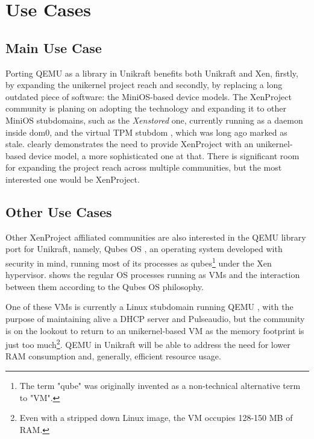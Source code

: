 \chapter{Use Cases}
\label{chapter:use-cases}

\section{Main Use Case}
\label{sec:main-use-case}

Porting QEMU as a library in Unikraft benefits both Unikraft and Xen, firstly, by expanding the unikernel project reach and secondly, by replacing a long outdated piece of software: the MiniOS-based device models.
The XenProject community is planing on adopting the technology and expanding it to other MiniOS stubdomains, such as the \textit{Xenstored} \cite{xenstored-stubdom} one, currently running as a daemon inside dom0, and the virtual TPM stubdom \cite{xen-tpm-stubdom}, which was long ago marked as stale.
 clearly demonstrates the need to provide XenProject with an unikernel-based device model, a more sophisticated one at that.
There is significant room for expanding the project reach across multiple communities, but the most interested one would be XenProject.


\section{Other Use Cases}
\label{sec:other-use-cases}

Other XenProject affiliated communities are also interested in the QEMU library port for Unikraft, namely, Qubes OS \cite{qubes-os}, an operating system developed with security in mind, running most of its processes as qubes\footnote{The term "qube" was originally invented as a non-technical alternative term to "VM".} under the Xen hypervisor.
 shows the regular OS processes running as VMs and the interaction between them according to the Qubes OS philosophy.


One of these VMs is currently a Linux stubdomain running QEMU \cite{qubes-os-linux-stubdom}, with the purpose of maintaining alive a DHCP server and Pulseaudio, but the community is on the lookout to return to an unikernel-based VM as the memory footprint is just too much\footnote{Even with a stripped down Linux image, the VM occupies 128-150 MB of RAM.}.
QEMU in Unikraft will be able to address the need for lower RAM consumption and, generally, efficient resource usage.

